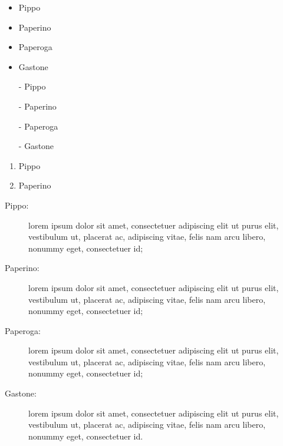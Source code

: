 \documentclass[a4paper,12pt]{article}
\begin{document}
\begin{itemize} \setlength{\itemsep}{1mm} %
\item Pippo
\item Paperino
\item Paperoga
\item Gastone
\end{itemize}


 \begin{itemize}
 \item[-] Pippo
 \item[-] Paperino
 \item[-] Paperoga
 \item[-] Gastone
 \end{itemize}


\begin{enumerate}
 \item Pippo
 \item Paperino
 \end{enumerate}


 \begin{description}
 \item[Pippo:] lorem ipsum dolor sit amet, consectetuer adipiscing elit ut purus elit, vestibulum ut, placerat ac, adipiscing vitae, felis nam arcu libero, nonummy eget, consectetuer id;
 
 \item[Paperino:] lorem ipsum dolor sit amet, consectetuer adipiscing elit ut purus elit, vestibulum ut, placerat ac, adipiscing vitae, felis nam arcu libero, nonummy eget, consectetuer id;
% 
 \item[Paperoga:] lorem ipsum dolor sit amet, consectetuer adipiscing elit ut purus elit, vestibulum ut, placerat ac, adipiscing vitae, felis nam arcu libero, nonummy eget, consectetuer id;
% 
 \item[Gastone:] lorem ipsum dolor sit amet, consectetuer adipiscing elit ut purus elit, vestibulum ut, placerat ac, adipiscing vitae, felis nam arcu libero, nonummy eget, consectetuer id.
 \end{description}
\end{document}
